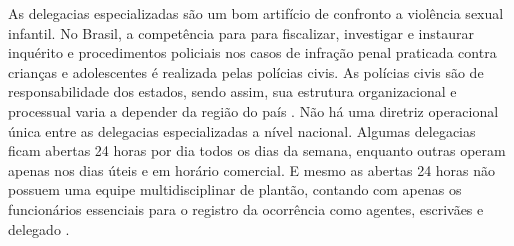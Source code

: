 

As delegacias especializadas são um bom artifício de confronto a violência sexual infantil. No Brasil, a competência para para fiscalizar, investigar e instaurar inquérito e procedimentos policiais nos casos de infração penal praticada contra crianças e adolescentes é realizada pelas polícias civis. As polícias civis são de responsabilidade dos estados, sendo assim, sua estrutura organizacional e processual varia a depender da região do país \cite{rodrigues2014}. Não há uma diretriz operacional única entre as delegacias especializadas a nível nacional. Algumas delegacias ficam abertas 24 horas por dia todos os dias da semana, enquanto outras operam apenas nos dias úteis e em horário comercial. E mesmo as abertas 24 horas não possuem uma equipe multidisciplinar de plantão, contando com apenas os funcionários essenciais para o registro da ocorrência como agentes, escrivães e delegado \cite{novo2016}. 





